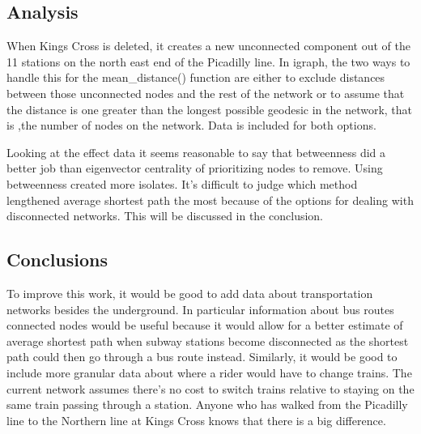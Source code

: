 \documentclass[11pt]{article} %
\begin{document}
\begin{center}
\end{center}

\begin{center}
\end{center}

\begin{center}
\end{center}




\subsection{Analysis}

When Kings Cross is deleted, it creates a new unconnected component out of the 11 stations on the north east end of the Picadilly line. In igraph, the two ways to handle this for the mean\_distance() function are either to exclude distances between those unconnected nodes and the rest of the network or to assume that the distance is one greater than the longest possible geodesic in the network, that is ,the number of nodes on the network. Data is included for both options. 

Looking at the effect data it seems reasonable to say that betweenness did a better job than eigenvector centrality of prioritizing nodes to remove. Using betweenness created more isolates. It's difficult to judge which method lengthened average shortest path the most because of the options for dealing with disconnected networks. This will be discussed in the conclusion. 



\subsection{Conclusions}

To improve this work, it would be good to add data about transportation networks besides the underground. In particular information about bus routes connected nodes would be useful because it would allow for a better estimate of average shortest path when subway stations become disconnected as the shortest path could then go through a bus route instead. Similarly, it would be good to include more granular data about where a rider would have to change trains. The current network assumes there's no cost to switch trains relative to staying on the same train passing through a station. Anyone who has walked from the Picadilly line to the Northern line at Kings Cross knows that there is a big difference. 
\end{document}
